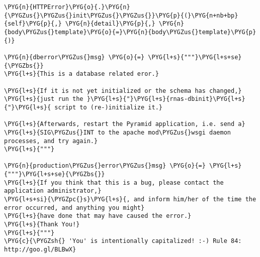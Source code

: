 \begin{Verbatim}[commandchars=\\\{\}]
        \PYG{n}{HTTPError}\PYG{o}{.}\PYG{n}{\PYGZus{}\PYGZus{}init\PYGZus{}\PYGZus{}}\PYG{p}{(}\PYG{n+nb+bp}{self}\PYG{p}{,} \PYG{n}{detail}\PYG{p}{,} \PYG{n}{body\PYGZus{}template}\PYG{o}{=}\PYG{n}{body\PYGZus{}template}\PYG{p}{)}

\PYG{n}{dberror\PYGZus{}msg} \PYG{o}{=} \PYG{l+s}{"""}\PYG{l+s+se}{\PYGZbs{}}
\PYG{l+s}{This is a database related eror.}

\PYG{l+s}{If it is not yet initialized or the schema has changed,}
\PYG{l+s}{just run the }\PYG{l+s}{"}\PYG{l+s}{rnas-dbinit}\PYG{l+s}{"}\PYG{l+s}{ script to (re-)initialize it.}

\PYG{l+s}{Afterwards, restart the Pyramid application, i.e. send a}
\PYG{l+s}{SIG\PYGZus{}INT to the apache mod\PYGZus{}wsgi daemon processes, and try again.}
\PYG{l+s}{"""}

\PYG{n}{production\PYGZus{}error\PYGZus{}msg} \PYG{o}{=} \PYG{l+s}{"""}\PYG{l+s+se}{\PYGZbs{}}
\PYG{l+s}{If you think that this is a bug, please contact the application administrator,}
\PYG{l+s+si}{\PYGZpc{}s}\PYG{l+s}{, and inform him/her of the time the error occurred, and anything you might}
\PYG{l+s}{have done that may have caused the error.}
\PYG{l+s}{Thank You!}
\PYG{l+s}{"""}
\PYG{c}{\PYGZsh{} 'You' is intentionally capitalized! :-) Rule 84: http://goo.gl/BLBwX}
\end{Verbatim}


